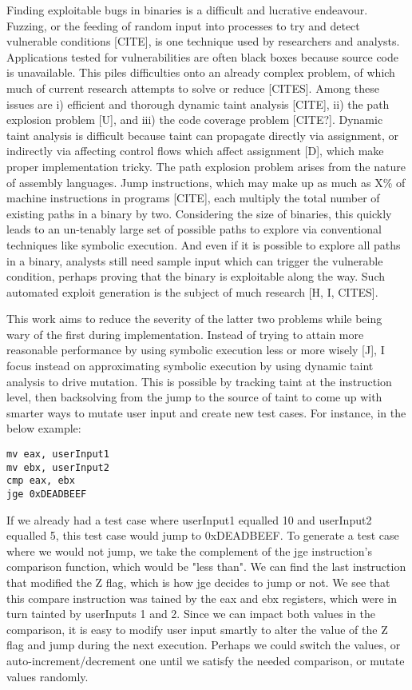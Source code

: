 \documentclass[10pt, twocolumn, times, nocopyrightspace, preprint]{sigplanconf}
\begin{document}
Finding exploitable bugs in binaries is a difficult and lucrative endeavour. Fuzzing, or the feeding of random input into processes to try and detect vulnerable conditions [CITE], is one technique used by researchers and analysts. Applications tested for vulnerabilities are often black boxes because source code is unavailable. This piles difficulties onto an already complex problem, of which much of current research attempts to solve or reduce [CITES]. Among these issues are i) efficient and thorough dynamic taint analysis [CITE], ii) the path explosion problem [U], and iii) the code coverage problem [CITE?]. Dynamic taint analysis is difficult because taint can propagate directly via assignment, or indirectly via affecting control flows which affect assignment [D], which make proper implementation tricky. The path explosion problem arises from the nature of assembly languages. Jump instructions, which may make up as much as X\% of machine instructions in programs [CITE], each multiply the total number of existing paths in a binary by two. Considering the size of binaries, this quickly leads to an un-tenably large set of possible paths to explore via conventional techniques like symbolic execution. And even if it is possible to explore all paths in a binary, analysts still need sample input which can trigger the vulnerable condition, perhaps proving that the binary is exploitable along the way. Such automated exploit generation is the subject of much research [H, I, CITES].

This work aims to reduce the severity of the latter two problems while being wary of the first during implementation. Instead of trying to attain more reasonable performance by using symbolic execution less or more wisely [J], I focus instead on approximating symbolic execution by using dynamic taint analysis to drive mutation. This is possible by tracking taint at the instruction level, then backsolving from the jump to the source of taint to come up with smarter ways to mutate user input and create new test cases. For instance, in the below example:

\begin{verbatim}
mv eax, userInput1
mv ebx, userInput2
cmp eax, ebx
jge 0xDEADBEEF
\end{verbatim}

If we already had a test case where userInput1 equalled 10 and userInput2 equalled 5, this test case would jump to 0xDEADBEEF. To generate a test case where we would not jump, we take the complement of the jge instruction's comparison function, which would be "less than". We can find the last instruction that modified the Z flag, which is how jge decides to jump or not. We see that this compare instruction was tained by the eax and ebx registers, which were in turn tainted by userInputs 1 and 2. Since we can impact both values in the comparison, it is easy to modify user input smartly to alter the value of the Z flag and jump during the next execution. Perhaps we could switch the values, or auto-increment/decrement one until we satisfy the needed comparison, or mutate values randomly.
\end{document}
